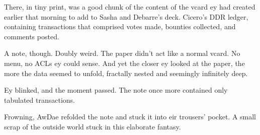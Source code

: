 There, in tiny print, was a good chunk of the content of the vcard ey had created earlier that morning to add to Sasha and Debarre's deck. Cicero's DDR ledger, containing transactions that comprised votes made, bounties collected, and comments posted.

A note, though. Doubly weird. The paper didn't act like a normal vcard. No menu, no ACLs ey could sense. And yet the closer ey looked at the paper, the more the data seemed to unfold, fractally nested and seemingly infinitely deep.

Ey blinked, and the moment passed. The note once more contained only tabulated transactions.

Frowning, AwDae refolded the note and stuck it into eir trousers' pocket. A small scrap of the outside world stuck in this elaborate fantasy.
